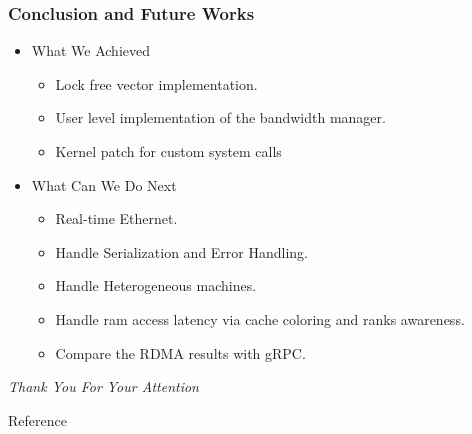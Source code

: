 \documentclass{beamer}
\begin{document}
\begin{frame}
    \frametitle{Conclusion and Future Works}
    \begin{itemize}
        \item What We Achieved
            \begin{itemize}
                \item Lock free vector implementation.
                \item User level implementation of the bandwidth manager.
                \item Kernel patch for custom system calls
            \end{itemize}
        \item What Can We Do Next
            \begin{itemize}
                \item Real-time Ethernet.
                \item Handle Serialization and Error Handling.
                \item Handle Heterogeneous machines.
                \item Handle ram access latency via cache coloring and ranks
                    awareness.
                \item Compare the RDMA results with gRPC.
            \end{itemize}
    \end{itemize}
\end{frame}

\begin{frame}
  \centering \Large
  \emph{Thank You For Your Attention}
\end{frame}

\begin{frame}{Reference}
    
     
\end{frame}
\end{document}
